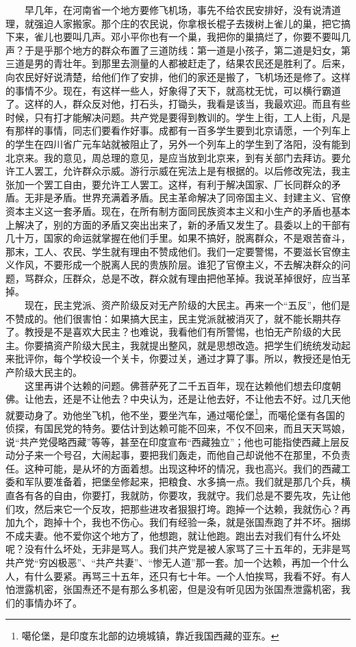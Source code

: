 \documentclass[cn,11pt,chinese]{elegantbook}
\begin{document}
　　早几年，在河南省一个地方要修飞机场，事先不给农民安排好，没有说清道理，就强迫人家搬家。那个庄的农民说，你拿根长棍子去拨树上雀儿的巢，把它搞下来，雀儿也要叫几声。邓小平你也有一个巢，我把你的巢搞烂了，你要不要叫几声？于是乎那个地方的群众布置了三道防线：第一道是小孩子，第二道是妇女，第三道是男的青壮年。到那里去测量的人都被赶走了，结果农民还是胜利了。后来，向农民好好说清楚，给他们作了安排，他们的家还是搬了，飞机场还是修了。这样的事情不少。现在，有这样一些人，好象得了天下，就高枕无忧，可以横行霸道了。这样的人，群众反对他，打石头，打锄头，我看是该当，我最欢迎。而且有些时候，只有打才能解决问题。共产党是要得到教训的。学生上街，工人上街，凡是有那样的事情，同志们要看作好事。成都有一百多学生要到北京请愿，一个列车上的学生在四川省广元车站就被阻止了，另外一个列车上的学生到了洛阳，没有能到北京来。我的意见，周总理的意见，是应当放到北京来，到有关部门去拜访。要允许工人罢工，允许群众示威。游行示威在宪法上是有根据的。以后修改宪法，我主张加一个罢工自由，要允许工人罢工。这样，有利于解决国家、厂长同群众的矛盾。无非是矛盾。世界充满着矛盾。民主革命解决了同帝国主义、封建主义、官僚资本主义这一套矛盾。现在，在所有制方面同民族资本主义和小生产的矛盾也基本上解决了，别的方面的矛盾又突出出来了，新的矛盾又发生了。县委以上的干部有几十万，国家的命运就掌握在他们手里。如果不搞好，脱离群众，不是艰苦奋斗，那末，工人、农民、学生就有理由不赞成他们。我们一定要警惕，不要滋长官僚主义作风，不要形成一个脱离人民的贵族阶层。谁犯了官僚主义，不去解决群众的问题，骂群众，压群众，总是不改，群众就有理由把他革掉。我说革掉很好，应当革掉。\\
　　现在，民主党派、资产阶级反对无产阶级的大民主。再来一个“五反”，他们是不赞成的。他们很害怕：如果搞大民主，民主党派就被消灭了，就不能长期共存了。教授是不是喜欢大民主？也难说，我看他们有所警惕，也怕无产阶级的大民主。你要搞资产阶级大民主，我就提出整风，就是思想改造。把学生们统统发动起来批评你，每个学校设一个关卡，你要过关，通过才算了事。所以，教授还是怕无产阶级大民主的。\\
　　这里再讲个达赖的问题。佛菩萨死了二千五百年，现在达赖他们想去印度朝佛。让他去，还是不让他去？中央认为，还是让他去好，不让他去不好。过几天他就要动身了。劝他坐飞机，他不坐，要坐汽车，通过噶伦堡\footnote[4]{ 噶伦堡，是印度东北部的边境城镇，靠近我国西藏的亚东。}，而噶伦堡有各国的侦探，有国民党的特务。要估计到达赖可能不回来，不仅不回来，而且天天骂娘，说“共产党侵略西藏”等等，甚至在印度宣布“西藏独立”；他也可能指使西藏上层反动分子来一个号召，大闹起事，要把我们轰走，而他自己却说他不在那里，不负责任。这种可能，是从坏的方面着想。出现这种坏的情况，我也高兴。我们的西藏工委和军队要准备着，把堡垒修起来，把粮食、水多搞一点。我们就是那几个兵，横直各有各的自由，你要打，我就防，你要攻，我就守。我们总是不要先攻，先让他们攻，然后来它一个反攻，把那些进攻者狠狠打垮。跑掉一个达赖，我就伤心？再加九个，跑掉十个，我也不伤心。我们有经验一条，就是张国焘跑了并不坏。捆绑不成夫妻。他不爱你这个地方了，他想跑，就让他跑。跑出去对我们有什么坏处呢？没有什么坏处，无非是骂人。我们共产党是被人家骂了三十五年的，无非是骂共产党“穷凶极恶”、“共产共妻”、“惨无人道”那一套。加一个达赖，再加一个什么人，有什么要紧。再骂三十五年，还只有七十年。一个人怕挨骂，我看不好。有人怕泄露机密，张国焘还不是有那么多机密，但是没有听见因为张国焘泄露机密，我们的事情办坏了。\\
\end{document}
